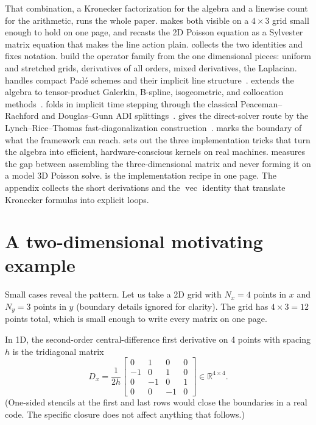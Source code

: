 \documentclass[11pt]{article}
\newcommand{\Dx}{D_{x}}
\newcommand{\R}{\mathbb{R}}
\newcommand{\vect}{\operatorname{vec}}
\begin{document}
That combination, a Kronecker factorization for the algebra and a
linewise count for the arithmetic, runs the whole paper.
 makes both visible on a $4 \times 3$ grid small
enough to hold on one page, and recasts the 2D Poisson equation as a
Sylvester matrix equation that makes the line action plain.
 collects the two identities and fixes notation.
 build the operator family from the one
dimensional pieces: uniform and stretched grids, derivatives of all
orders, mixed derivatives, the Laplacian.  
handles compact Pad\'{e} schemes and their implicit line
structure~\citep{lele1992compact,beam1976implicit}.
 extends the algebra to tensor-product Galerkin,
B-spline, isogeometric, and collocation
methods~\citep{deboor1978practical,hughes2005isogeometric,cottrell2009isogeometric,johnson2005higher,bay2019dissertation}.
 folds in implicit time stepping through the
classical Peaceman--Rachford and Douglas--Gunn ADI
splittings~\citep{peaceman1955numerical,douglas1962alternating,douglas1964numerical}.
 gives the direct-solver route by the
Lynch--Rice--Thomas fast-diagonalization
construction~\citep{lynch1964direct,haidvogel1979accurate}.
 marks the boundary of what the framework
can reach.   sets out the three
implementation tricks that turn the algebra into efficient,
hardware-conscious kernels on real machines.  
measures the gap between assembling the three-dimensional matrix and
never forming it on a model 3D Poisson solve.   is the
implementation recipe in one page.  The appendix collects the short
derivations and the $\vect{}$ identity that translate Kronecker
formulas into explicit loops.


\section{A two-dimensional motivating example}
\label{sec:example}

Small cases reveal the pattern.  Let us take a
2D grid with $N_x = 4$ points in $x$ and $N_y = 3$ points in $y$
(boundary details ignored for clarity).  The grid has $4 \times 3 = 12$
points total, which is small enough to write every matrix on one page.

In 1D, the second-order central-difference first derivative on 4 points
with spacing $h$ is the tridiagonal matrix
\begin{equation}
\label{eq:Dx-small}
  \Dx = \frac{1}{2h}
  \begin{bmatrix}
     0 &  1 &  0 &  0 \\
    -1 &  0 &  1 &  0 \\
     0 & -1 &  0 &  1 \\
     0 &  0 & -1 &  0
  \end{bmatrix}
  \in \R^{4 \times 4}.
\end{equation}
(One-sided stencils at the first and last rows would close the
boundaries in a real code.  The specific closure does not affect
anything that follows.)
\end{document}
